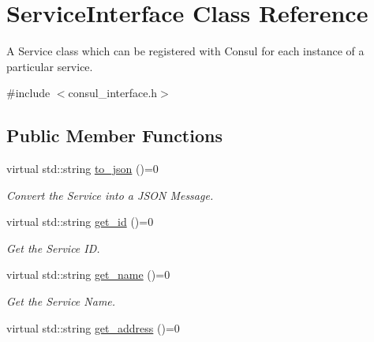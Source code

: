 \hypertarget{classServiceInterface}{}\section{Service\+Interface Class Reference}
\label{classServiceInterface}


A Service class which can be registered with Consul for each instance of a particular service.  




{\ttfamily \#include $<$consul\+\_\+interface.\+h$>$}

\subsection*{Public Member Functions}
\begin{DoxyCompactItemize}
\item 
virtual std\+::string \hyperlink{classServiceInterface_a2c041d65d3e725f1cf8e2379f4620d58}{to\+\_\+json} ()=0
\begin{DoxyCompactList}\small\item\em Convert the Service into a J\+S\+ON Message. \end{DoxyCompactList}\item 
virtual std\+::string \hyperlink{classServiceInterface_a0ba731e4d379cbeddc852304b470c617}{get\+\_\+id} ()=0\hypertarget{classServiceInterface_a0ba731e4d379cbeddc852304b470c617}{}\label{classServiceInterface_a0ba731e4d379cbeddc852304b470c617}

\begin{DoxyCompactList}\small\item\em Get the Service ID. \end{DoxyCompactList}\item 
virtual std\+::string \hyperlink{classServiceInterface_aed2140959e23f98cd0cca1a101646384}{get\+\_\+name} ()=0\hypertarget{classServiceInterface_aed2140959e23f98cd0cca1a101646384}{}\label{classServiceInterface_aed2140959e23f98cd0cca1a101646384}

\begin{DoxyCompactList}\small\item\em Get the Service Name. \end{DoxyCompactList}\item 
virtual std\+::string \hyperlink{classServiceInterface_a6c4fd6eff9e1c8eed5dfed301d2f8047}{get\+\_\+address} ()=0\hypertarget{classServiceInterface_a6c4fd6eff9e1c8eed5dfed301d2f8047}{}\label{classServiceInterface_a6c4fd6eff9e1c8eed5dfed301d2f8047}


\end{DoxyCompactItemize}
